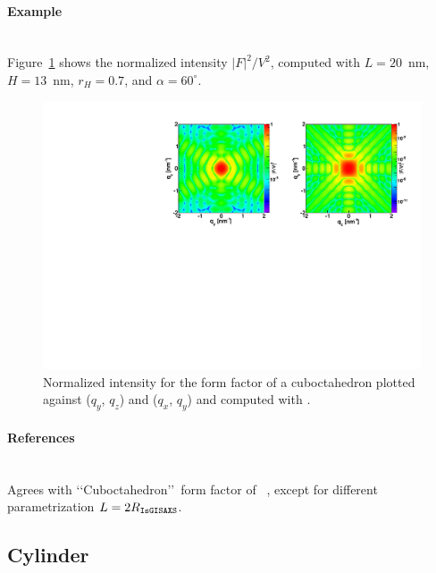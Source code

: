 \paragraph{Example}\strut\\
Figure~\ref{fig:FFcuboctahEx} shows the normalized intensity $|F|^2/V^2$, computed with $L=20$~nm, $H=13$~nm, $r_H=0.7$, and $\alpha=60^{\circ}$.
\begin{figure}[h]
\begin{center}
\includegraphics[angle=-90,width=\textwidth]{fig/ff/figffcuboctah.pdf}
\end{center}
\caption{Normalized intensity for the form factor of a cuboctahedron plotted against ($q_y$, $q_z$) and  ($q_x$, $q_y$) and computed with .}
\label{fig:FFcuboctahEx}
\end{figure}

\paragraph{References}\strut\\
Agrees with \lq\lq Cuboctahedron\rq\rq\ form factor of \IsGISAXS~\cite{Laz02},
except for different parametrization $L=2R_{\rm{\texttt{IsGISAXS}}}$.

\clearpage
\subsection{Cylinder} \label{sec:Cylinder}
 
